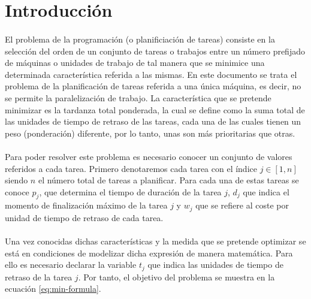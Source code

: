 \documentclass[spanish]{article}
\begin{document}
	\maketitle %

	\thispagestyle{fancy} %



	\begin{abstract}
		\noindent [TODO ]
	\end{abstract}


	\section{Introducción}
	\label{sec:intro}

		\paragraph{}
		El problema de la programación (o planificiación de tareas) consiste en la selección del orden de un conjunto de tareas o trabajos entre un número prefijado de máquinas o unidades de trabajo de tal manera que se minimice una determinada característica referida a las mismas. En este documento se trata el problema de la planificación de tareas referida a una única máquina, es decir, no se permite la paralelización de trabajo. La característica que se pretende minimizar es la tardanza total ponderada, la cual se define como la suma total de las unidades de tiempo de retraso de las tareas, cada una de las cuales tienen un peso (ponderación) diferente, por lo tanto, unas son más prioritarias que otras.

		\paragraph{}
		Para poder resolver este problema es necesario conocer un conjunto de valores referidos a cada tarea. Primero denotaremos cada tarea con el índice $j \in [1,n]$ siendo $n$ el número total de tareas a planificar. Para cada una de estas tareas se conoce $p_j$, que determina el tiempo de duración de la tarea $j$, $d_j$ que indica el momento de finalización máximo de la tarea $j$ y $w_j$ que se refiere al coste por unidad de tiempo de retraso de cada tarea.

		\paragraph{}
		Una vez conocidas dichas características y la medida que se pretende optimizar se está en condiciones de modelizar dicha expresión de manera matemática. Para ello es necesario declarar la variable $t_j$ que indica las unidades de tiempo de retraso de la tarea $j$. Por tanto, el objetivo del problema se muestra en la ecuación \eqref{eq:min-formula}.
\end{document}
